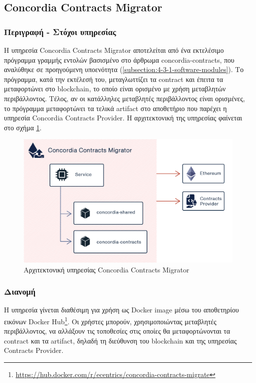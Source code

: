 \subsection{Concordia Contracts Migrator} \label{subsection:4-3-3-concordia-contracts-migrator}

\subsubsection{Περιγραφή - Στόχοι υπηρεσίας}

Η υπηρεσία Concordia Contracts Migrator αποτελείται από ένα εκτελέσιμο πρόγραμμα γραμμής εντολών βασισμένο στο άρθρωμα concordia-contracts, που αναλύθηκε σε προηγούμενη υποενότητα (\ref{subsection:4-3-1-software-modules}). Το πρόγραμμα, κατά την εκτέλεσή του, μεταγλωττίζει τα contract και έπειτα τα μεταφορτώνει στο blockchain, το οποίο είναι ορισμένο με χρήση μεταβλητών περιβάλλοντος. Τέλος, αν οι κατάλληλες μεταβλητές περιβάλλοντος είναι ορισμένες, το πρόγραμμα μεταφορτώνει τα τελικά artifact στο αποθετήριο που παρέχει η υπηρεσία Concordia Contracts Provider. Η αρχιτεκτονική της υπηρεσίας φαίνεται στο σχήμα \ref{figure:4-3-concordia-contracts-migrator-architecture}.

\vspace{.5\baselineskip}

\begin{figure}[H]
    \centering
    \includegraphics[width=.75\textwidth]{assets/figures/chapter-4/4.3.architecture-4.3.3.concordia-contracts-migrator-architecture}
    \caption{Αρχιτεκτονική υπηρεσίας Concordia Contracts Migrator}
    \label{figure:4-3-concordia-contracts-migrator-architecture}
\end{figure}

\subsubsection{Διανομή}

Η υπηρεσία γίνεται διαθέσιμη για χρήση ως Docker image μέσω του αποθετηρίου εικόνων Docker Hub\footnote{\url{https://hub.docker.com/r/ecentrics/concordia-contracts-migrate}}. Οι χρήστες μπορούν, χρησιμοποιώντας μεταβλητές περιβάλλοντος, να αλλάξουν τις τοποθεσίες στις οποίες θα μεταφορτώνονται τα contract και τα artifact, δηλαδή τη διεύθυνση του blockchain και της υπηρεσίας Contracts Provider.